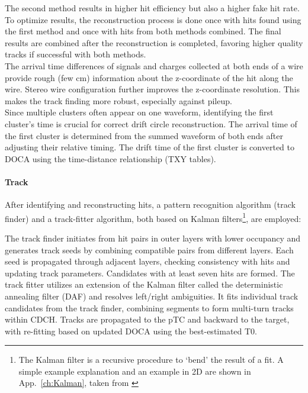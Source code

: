 \begin{refsection}
        \noindent
        The second method results in higher hit efficiency but also a higher fake hit rate. 
        To optimize results, the reconstruction process is done once with hits found using the first method and once with hits from both methods combined. 
        The final results are combined after the reconstruction is completed, favoring higher quality tracks if successful with both methods. \\
        The arrival time differences of signals and charges collected at both ends of a wire provide rough (few cm) information about the z-coordinate of the hit along the wire. 
        Stereo wire configuration further improves the z-coordinate resolution.
        This makes the track finding more robust, especially against pileup. \\
        Since multiple clusters often appear on one waveform, identifying the first cluster's time is crucial for correct drift circle reconstruction. 
        The arrival time of the first cluster is determined from the summed waveform of both ends after adjusting their relative timing. 
        The drift time of the first cluster is converted to DOCA using the time-distance relationship (TXY tables).

        \paragraph{Track} After identifying and reconstructing hits, a pattern recognition algorithm (track finder) and a track-fitter algorithm, both based on Kalman filters\footnote{The Kalman filter is a recursive procedure to `bend' the result of a fit. A simple example explanation and an example in 2D are shown in App.~\ref{ch:Kalman}, taken from \cite{mythesis}}, are employed:

        \begin{outline}
            \1 The track finder initiates from hit pairs in outer layers with lower occupancy and generates track seeds by combining compatible pairs from different layers. 
            Each seed is propagated through adjacent layers, checking consistency with hits and updating track parameters. 
            Candidates with at least seven hits are formed.
            \1 The track fitter utilizes an extension of the Kalman filter called the deterministic annealing filter (DAF) and resolves left/right ambiguities. 
            It fits individual track candidates from the track finder, combining segments to form multi-turn tracks within CDCH. 
            Tracks are propagated to the pTC and backward to the target, with re-fitting based on updated DOCA using the best-estimated T0.
        \end{outline}


\end{refsection}
